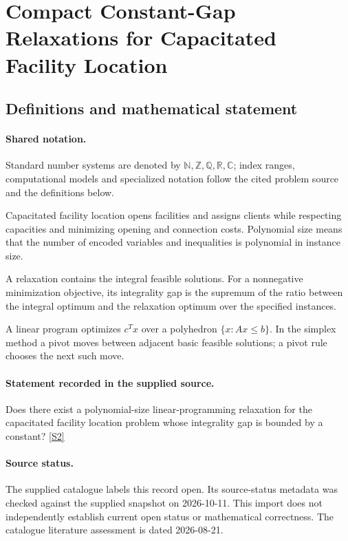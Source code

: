 \documentclass[11pt]{article}
\newcommand{\sref}[2]{\hyperlink{source:#1:#2}{[S#2]}}
\begin{document}
\section{Compact Constant-Gap Relaxations for Capacitated Facility Location}\label{statement}

\subsection{Definitions and mathematical statement}

\paragraph{Shared notation.}Standard number systems are denoted by $\mathbb N,\mathbb Z,\mathbb Q,\mathbb R,\mathbb C$; index ranges, computational models and specialized notation follow the cited problem source and the definitions below.


Capacitated facility location opens facilities and assigns clients while respecting capacities and minimizing opening and connection costs. Polynomial size means that the number of encoded variables and inequalities is polynomial in instance size.

A relaxation contains the integral feasible solutions. For a nonnegative minimization objective, its integrality gap is the supremum of the ratio between the integral optimum and the relaxation optimum over the specified instances.

A linear program optimizes $c^Tx$ over a polyhedron $\{x:Ax\leq b\}$. In the simplex method a pivot moves between adjacent basic feasible solutions; a pivot rule chooses the next such move.
\paragraph{Statement recorded in the supplied source.}
Does there exist a polynomial-size linear-programming relaxation for the capacitated facility location problem whose integrality gap is bounded by a constant? \sref{statement}{2}
\paragraph{Source status.}
The supplied catalogue labels this record open. Its source-status metadata was checked against the supplied snapshot on 2026-10-11. This import does not independently establish current open status or mathematical correctness. The catalogue literature assessment is dated 2026-08-21.
\end{document}
